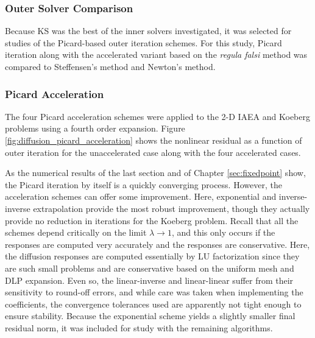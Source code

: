 \subsubsection{Outer Solver Comparison}

Because KS was the best of the inner solvers investigated, it was 
selected for studies of the Picard-based outer iteration schemes.
For this study, Picard iteration along with the accelerated variant 
based on the {\it regula falsi} method was compared to Steffensen's 
method and Newton's method.  

\subsubsection{Picard Acceleration}

The four Picard acceleration schemes were applied to the 2-D IAEA 
and Koeberg problems
using a fourth order expansion.  
Figure \ref{fig:diffusion_picard_acceleration}
shows the nonlinear residual as a function of outer iteration for the 
unaccelerated case along with the four accelerated cases. 

As the numerical results of the last section and of Chapter 
\ref{sec:fixedpoint} show, the Picard iteration by itself is a 
quickly converging process.  However, the acceleration schemes
can offer some improvement.  Here,
 exponential and inverse-inverse extrapolation provide the 
most robust improvement, though they actually provide no reduction 
in iterations for the Koeberg problem.
Recall that all the schemes depend critically
on the limit $\lambda \to 1$, and this only occurs if the responses are 
computed very accurately and the responses are conservative.  Here, the 
 diffusion responses are computed essentially by LU factorization since 
 they are such small problems and are conservative based on the 
 uniform mesh and DLP expansion.  Even so, the linear-inverse and 
 linear-linear suffer from their sensitivity to round-off errors, and
 while care was taken when implementing the coefficients, the convergence 
 tolerances used are apparently not tight enough to ensure stability.
Because the exponential scheme yields a slightly smaller final residual
norm, it was included for study with the remaining algorithms.
 
